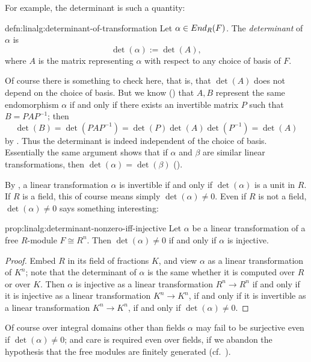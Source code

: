For example, the determinant is such a quantity:
\begin{defn}{}{defn:linalg:determinant-of-transformation}
  Let $\alpha \in End_R(F)$. The \emph{determinant} of $\alpha$ is
  \[
    \det(\alpha) := \det(A),
  \]
  where $A$ is the matrix representing $\alpha$ with respect to any
  choice of basis of $F$.
\end{defn}
Of course there is something to check here, that is, that $\det(A)$
does not depend on the choice of basis. But we know
() that $A, B$ represent the same endomorphism
$\alpha$ if and only if there exists an invertible matrix $P$ such
that $B = PAP^{-1}$; then
\[
  \det(B) = \det(PAP^{-1}) = \det(P)\det(A)\det(P^{-1}) = \det(A)
\]
by . Thus the determinant is indeed independent of
the choice of basis. Essentially the same argument shows that if
$\alpha$ and $\beta$ are similar linear transformations, then
$\det(\alpha) = \det(\beta)$
().

By , a linear transformation $\alpha$ is invertible
if and only if $\det(\alpha)$ is a unit in $R$. If $R$ is a field,
this of course means simply $\det(\alpha) \neq 0$. Even if $R$ is not
a field, $\det(\alpha) \neq 0$ says something interesting:
\begin{prop}{}{prop:linalg:determinant-nonzero-iff-injective}
  Let $\alpha$ be a linear transformation of a free $R$-module
  $F \cong R^n$. Then $\det(\alpha) \neq 0$ if and only if $\alpha$ is
  injective.
\end{prop}
\begin{proof}
  Embed $R$ in its field of fractions $K$, and view $\alpha$ as a
  linear transformation of $K^n$; note that the determinant of
  $\alpha$ is the same whether it is computed over $R$ or over
  $K$. Then $\alpha$ is injective as a linear transformation
  $R^n \to R^n$ if and only if it is injective as a linear
  transformation $K^n \to K^n$, if and only if it is invertible as a
  linear transformation $K^n \to K^n$, if and only if
  $\det(\alpha) \neq 0$.
\end{proof}

Of course over integral domains other than fields $\alpha$ may fail to
be surjective even if $\det(\alpha) \neq 0$; and care is required even
over fields, if we abandon the hypothesis that the free modules are
finitely generated (cf.\
).

